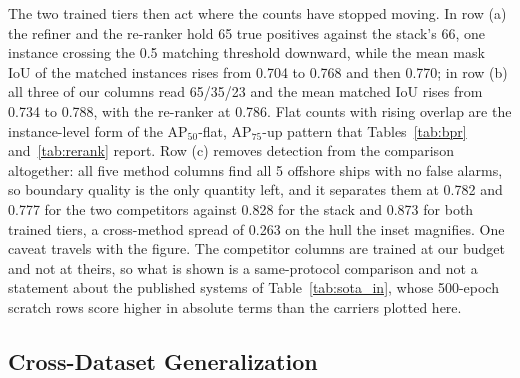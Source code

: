 The two trained tiers then act where the counts have stopped moving. In row (a) the refiner and the re-ranker hold 65 true positives against the stack's 66, one instance crossing the 0.5 matching threshold downward, while the mean mask IoU of the matched instances rises from 0.704 to 0.768 and then 0.770; in row (b) all three of our columns read 65/35/23 and the mean matched IoU rises from 0.734 to 0.788, with the re-ranker at 0.786. Flat counts with rising overlap are the instance-level form of the AP$_{50}$-flat, AP$_{75}$-up pattern that Tables~\ref{tab:bpr} and~\ref{tab:rerank} report. Row (c) removes detection from the comparison altogether: all five method columns find all 5 offshore ships with no false alarms, so boundary quality is the only quantity left, and it separates them at 0.782 and 0.777 for the two competitors against 0.828 for the stack and 0.873 for both trained tiers, a cross-method spread of 0.263 on the hull the inset magnifies. One caveat travels with the figure. The competitor columns are trained at our budget and not at theirs, so what is shown is a same-protocol comparison and not a statement about the published systems of Table~\ref{tab:sota_in}, whose 500-epoch scratch rows score higher in absolute terms than the carriers plotted here.

\subsection{Cross-Dataset Generalization}\label{sec:exp:ssdd}


